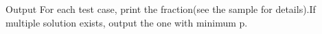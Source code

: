 Output  
For each test case, print the fraction(see the sample for details).If multiple solution exists, output the one with minimum p.